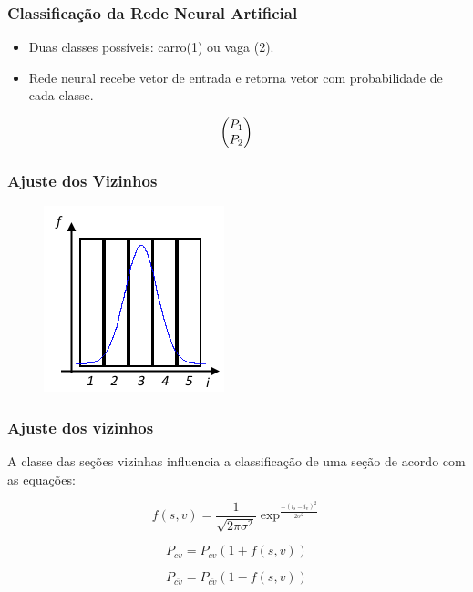 \documentclass{beamer}
\begin{document}
\begin{frame}
\frametitle{Classificação da Rede Neural Artificial}
   \begin{itemize}
   \item Duas classes possíveis: carro(1) ou vaga (2).
   \item Rede neural recebe vetor de entrada e retorna vetor com probabilidade de cada classe.
   \end{itemize}
  \begin{equation}
	\centering	
	\begin{pmatrix}
	P_1\\P_2
	\end{pmatrix}  
	\centering
  \end{equation}

\end{frame}


\begin{frame}
\frametitle{Ajuste dos Vizinhos}
  \begin{figure}
	\centering
	\includegraphics[width=.4\textwidth]{Influencia}
	\centering
\end{figure}
\end{frame}


\begin{frame}
\frametitle{Ajuste dos vizinhos}

A classe das seções vizinhas influencia a classificação de uma seção de acordo com as equações:

   \begin{equation}
	f(s,v) = \frac{1}{\sqrt{2\pi\sigma^2}} \exp^{\frac{-(i_s-i_v)^2}{2\sigma^2}} 
	\end{equation}

\begin{equation}
	P_{cv}  = P_{cv}(1+f(s,v))
\end{equation}

\begin{equation}
	P_{\overline{cv}}  = P_{\overline{cv}}(1-f(s,v))
\end{equation}
\end{frame}
\end{document}
